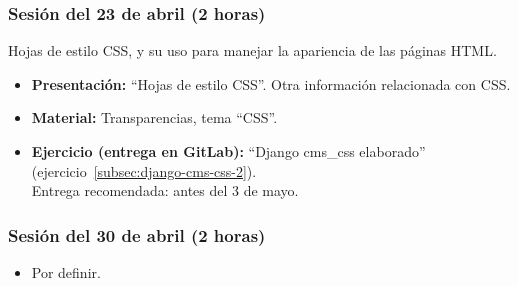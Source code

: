 \documentclass[a4paper,12pt]{article}
\begin{document}
\subsubsection{Sesión del 23 de abril (2 horas)}

Hojas de estilo CSS, y su uso para manejar la apariencia de las páginas HTML.

\begin{itemize}
\item \textbf{Presentación:} ``Hojas de estilo CSS''. Otra información relacionada con CSS.
 \item \textbf{Material:} Transparencias, tema ``CSS''.
\item \textbf{Ejercicio (entrega en GitLab):} ``Django cms\_css elaborado'' (ejercicio~\ref{subsec:django-cms-css-2}). \\
  Entrega recomendada: antes del 3 de mayo.
\end{itemize}

\subsubsection{Sesión del 30 de abril (2 horas)}

\begin{itemize}
\item Por definir.
\end{itemize}





\end{document}
